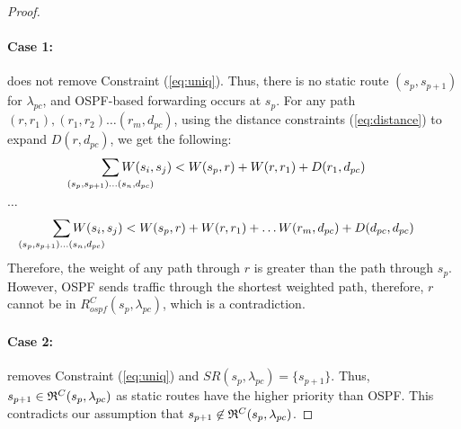 \begin{proof}
\paragraph{Case 1:} 
 does not remove Constraint (\ref{eq:uniq}). 
Thus, there is no static route $(s_p, s_{p+1})$ for
$\lambda_{pc}$, and OSPF-based forwarding occurs at $s_{p}$. 
For any path $(r, r_1), (r_1, r_2) \ldots (r_m, d_{pc})$, 
using the distance constraints (\ref{eq:distance}) to
expand $D(r, d_{pc})$, we get the following: 
\[
\sum_{\mathclap{\substack{(s_{p},s_{p+1})\ldots(s_{n},d_{pc})}}} 
W(s_i, s_j) < W(s_{p}, r) + W(r, r_{1}) + D(r_{1}, d_{pc})
\]
\begin{center}
	$\ldots$
\end{center}
\[
\sum_{\mathclap{\substack{(s_{p},s_{p+1})\ldots(s_{n},d_{pc})}}} 
W(s_i, s_j) < W(s_{p}, r) + W(r, r_{1}) + \ldots W(r_{m}, d_{pc}) + D(d_{pc}, d_{pc})
\]
Therefore, the weight of any path through $r$ is greater than 
the path through $s_{p}$. However, 
OSPF sends traffic through the shortest weighted
path, therefore, $r$ cannot be in $R^C_{ospf}(s_p, \lambda_{pc})$,
which is a contradiction. 

\paragraph{Case 2:}  
 removes Constraint (\ref{eq:uniq}) 
and $SR(s_p, \lambda_{pc}) = \{s_{p+1}\}$. 
Thus, $s_{p+1} \in \mathfrak{R}^C(s_{p}, \lambda_{pc})$ as static routes 
have the higher priority than OSPF. This contradicts our assumption
that $s_{p+1} \not\in \mathfrak{R}^C(s_{p}, \lambda_{pc})$. 
\end{proof}